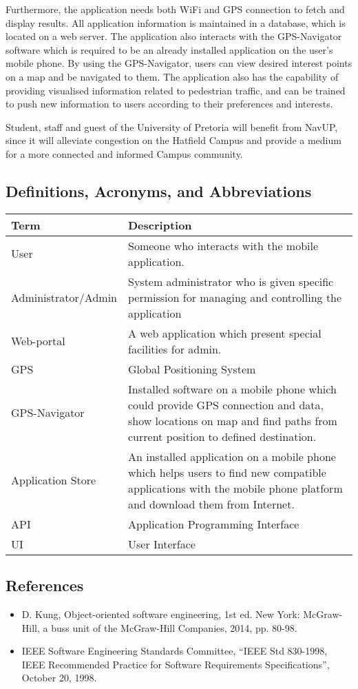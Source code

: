 \documentclass[12pt,a4paper]{article}
\begin{document}
Furthermore, the application needs both WiFi and GPS connection to fetch and display results. All application information is maintained in a database, which is located on a web server. The application also interacts with the GPS-Navigator software which is required to be an already installed application on the user’s mobile phone. By using the GPS-Navigator, users can view desired interest points on a map and be navigated to them. The application also has the capability of providing visualised information related to pedestrian traffic, and can be trained to push new information to users according to their preferences and interests.\newline

Student, staff and guest of the University of Pretoria will benefit from NavUP, since it will alleviate congestion on the Hatfield Campus and provide a medium for a more connected and informed Campus community.  
	\subsection{Definitions, Acronyms, and Abbreviations}
		\begin{tabular}{|p{4cm}|p{10cm}|}
			\hline
				\textbf{Term} & \textbf{Description}\\
			\hline
				User & Someone who interacts with the mobile application.\\
			\hline
				Administrator/Admin & System administrator who is given specific permission for managing and controlling the application\\
			\hline
				Web-portal & A web application which present special facilities for admin.\\
			\hline
				GPS & Global Positioning System\\
			\hline
				GPS-Navigator & Installed software on a mobile phone which could provide GPS
connection and data, show locations on map and find paths from current position to defined destination.\\
			\hline
				Application Store & An installed application on a mobile phone which helps users to find new compatible applications with the mobile phone platform and download them from Internet.\\
			\hline
				API & Application Programming Interface\\
			\hline
				UI & User Interface\\
			\hline
		\end{tabular}
	\subsection{References}
		\begin{itemize}
			\item D. Kung, Object-oriented software engineering, 1st ed. New York: McGraw-Hill, a buss unit of the McGraw-Hill Companies, 2014, pp. 80-98.
			\item IEEE Software Engineering Standards Committee, “IEEE Std 830-1998, IEEE Recommended Practice for Software Requirements Specifications”, October 20, 1998.
		\end{itemize}
\end{document}
